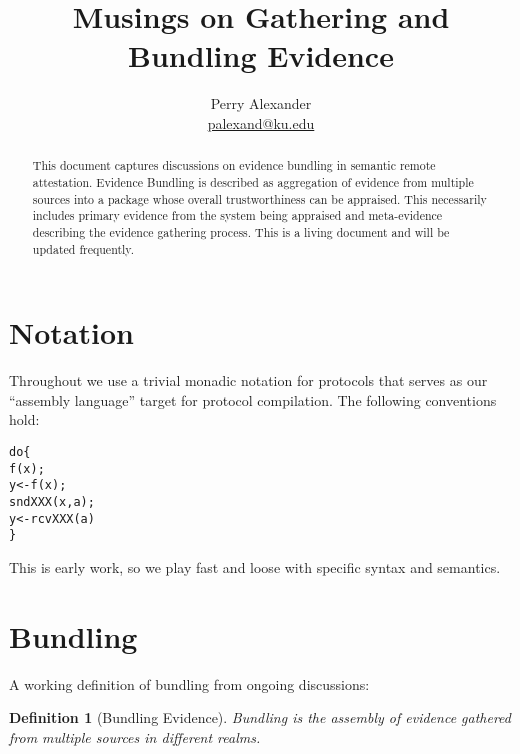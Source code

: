 \documentclass[10pt]{article}
\title{Musings on Gathering and Bundling Evidence}
\author{Perry Alexander \\
 \url{palexand@ku.edu}}
\newtheorem{definition}{Definition}
\begin{document}
\maketitle

\begin{abstract}
  This document captures discussions on evidence bundling in semantic
  remote attestation.  Evidence Bundling is described as aggregation
  of evidence from multiple sources into a package whose overall
  trustworthiness can be appraised.  This necessarily includes primary
  evidence from the system being appraised and meta-evidence
  describing the evidence gathering process.  This is a living
  document and will be updated frequently.
\end{abstract}

\section*{Notation}

Throughout we use a trivial monadic notation for protocols that serves
as our ``assembly language'' target for protocol compilation.
The following conventions hold:

\begin{alltt}
  do \{                % evaluate functions in sequence
       f(x);          % calculate f(x) and discard the result
       y <- f(x);     % calculate f(x) and bind the result to y
       sndXXX(x,a);   % an operation on x that performs a calculation
                      %  and sends data to a
       y <- rcvXXX(a) % an operation that receives data from
                      %  a performs a calculation and binds the
                      %  result to y
  \}
\end{alltt}

This is early work, so we play fast and loose with specific syntax and
semantics.

\section*{Bundling}

A working definition of bundling from ongoing discussions:

\begin{definition}[Bundling Evidence]
  Bundling is the assembly of evidence gathered from multiple sources
  in different realms.
\end{definition}
\end{document}
